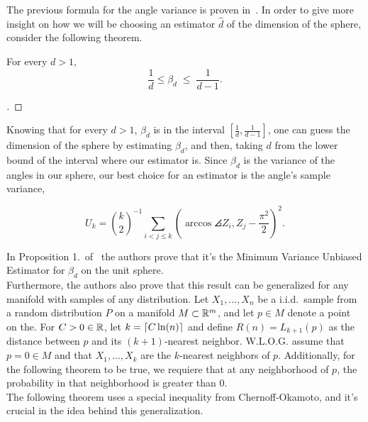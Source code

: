 The previous formula for the angle variance is proven in~\cite{diaz2019local}. In order to give more insight on how we will be choosing an estimator $\widehat{d}$ of the dimension of the sphere, consider the following theorem.

\begin{theorem}\label{ade:T1}
  For every $d > 1$,
  \[ \frac{1}{d} \leq \beta_d \;\leq\; \frac{1}{d-1}. \] 
\end{theorem}
\begin{proof}[]

\end{proof}

\vspace*{1em}

Knowing that for every $d > 1$, $\beta_d$ is in the interval $[\tfrac{1}{d}, \tfrac{1}{d-1}]$, one can guess the dimension of the sphere by estimating $\beta_d$, and then, taking $d$ from the lower bound of the interval where our estimator is. Since $\beta_d$ is the variance of the angles in our sphere, our best choice for an estimator is the angle's sample variance,


\begin{equation}\label{ade:2}
  U_{k} = \binom{k}{2}^{-1} \sum_{i<j\leq k}{\left(
    \arccos\angles{Z_i, Z_j} - \frac{\pi^2}{2} 
    \right)}^{2}.
\end{equation}

In Proposition 1.\ of~\cite{diaz2019local} the authors prove that it's the Minimum Variance Unbiased Estimator for $\beta_d$ on the unit sphere.\\[0.5 em]

Furthermore, the authors also prove that this result can be generalized for any manifold with samples of any distribution. Let $X_1,\ldots, X_n$ be a i.i.d.\ sample from a random distribution $P$ on a manifold $M \subset \mathbb{R}^m$, and let $p \in M$ denote a point on the. For $C>0 \in  \mathbb{R}$, let $k = \left\lceil C \ln(n)\right\rceil$ and define $R(n) = L_{k+1}(p)$ as the distance between $p$ and its $(k+1)$-nearest neighbor. W.L.O.G. assume that $p = 0 \in M$ and that $X_1,\ldots, X_k$ are the $k$-nearest neighbors of $p$. Additionally, for the following theorem to be true, we requiere that at any neighborhood of $p$, the probability in that neighborhood is greater than 0.\\[0.5 em]

The following theorem uses a special inequality from Chernoff-Okamoto, and it's crucial in the idea behind this generalization.

